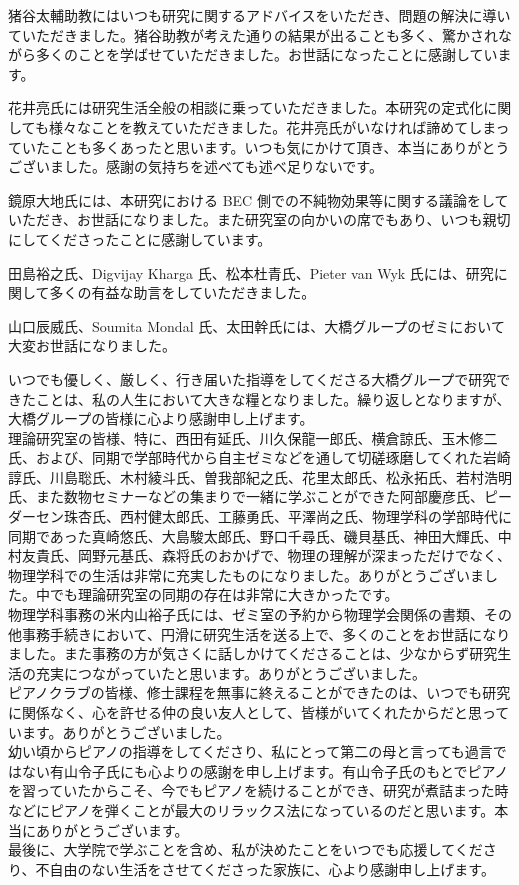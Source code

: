 猪谷太輔助教にはいつも研究に関するアドバイスをいただき、問題の解決に導いていただきました。猪谷助教が考えた通りの結果が出ることも多く、驚かされながら多くのことを学ばせていただきました。お世話になったことに感謝しています。

花井亮氏には研究生活全般の相談に乗っていただきました。本研究の定式化に関しても様々なことを教えていただきました。花井亮氏がいなければ諦めてしまっていたことも多くあったと思います。いつも気にかけて頂き、本当にありがとうございました。感謝の気持ちを述べても述べ足りないです。

鏡原大地氏には、本研究における BEC 側での不純物効果等に関する議論をしていただき、お世話になりました。また研究室の向かいの席でもあり、いつも親切にしてくださったことに感謝しています。

田島裕之氏、Digvijay Kharga 氏、松本杜青氏、Pieter van Wyk 氏には、研究に関して多くの有益な助言をしていただきました。

山口辰威氏、Soumita Mondal 氏、太田幹氏には、大橋グループのゼミにおいて大変お世話になりました。


いつでも優しく、厳しく、行き届いた指導をしてくださる大橋グループで研究できたことは、私の人生において大きな糧となりました。繰り返しとなりますが、大橋グループの皆様に心より感謝申し上げます。
\\

理論研究室の皆様、特に、西田有延氏、川久保龍一郎氏、横倉諒氏、玉木修二氏、および、同期で学部時代から自主ゼミなどを通して切磋琢磨してくれた岩崎諄氏、川島聡氏、木村綾斗氏、曽我部紀之氏、花里太郎氏、松永拓氏、若村浩明氏、また数物セミナーなどの集まりで一緒に学ぶことができた阿部慶彦氏、ピーダーセン珠杏氏、西村健太郎氏、工藤勇氏、平澤尚之氏、物理学科の学部時代に同期であった真崎悠氏、大島駿太郎氏、野口千尋氏、磯貝基氏、神田大輝氏、中村友貴氏、岡野元基氏、森将氏のおかげで、物理の理解が深まっただけでなく、物理学科での生活は非常に充実したものになりました。ありがとうございました。中でも理論研究室の同期の存在は非常に大きかったです。
\\

\clearpage
物理学科事務の米内山裕子氏には、ゼミ室の予約から物理学会関係の書類、その他事務手続きにおいて、円滑に研究生活を送る上で、多くのことをお世話になりました。また事務の方が気さくに話しかけてくださることは、少なからず研究生活の充実につながっていたと思います。ありがとうございました。
\\

ピアノクラブの皆様、修士課程を無事に終えることができたのは、いつでも研究に関係なく、心を許せる仲の良い友人として、皆様がいてくれたからだと思っています。ありがとうございました。
\\

幼い頃からピアノの指導をしてくださり、私にとって第二の母と言っても過言ではない有山令子氏にも心よりの感謝を申し上げます。有山令子氏のもとでピアノを習っていたからこそ、今でもピアノを続けることができ、研究が煮詰まった時などにピアノを弾くことが最大のリラックス法になっているのだと思います。本当にありがとうございます。
\\

最後に、大学院で学ぶことを含め、私が決めたことをいつでも応援してくださり、不自由のない生活をさせてくださった家族に、心より感謝申し上げます。
